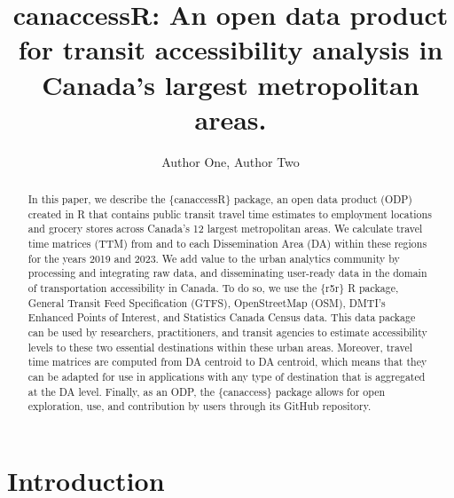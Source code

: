 \documentclass[Royal,times,sageh]{sagej}
\begin{document}

\title{canaccessR: An open data product for transit accessibility
analysis in Canada's largest metropolitan areas.}

\runninghead{}

\author{Author One\affilnum{}, Author Two\affilnum{}}

\affiliation{}



\begin{abstract}
In this paper, we describe the \{canaccessR\} package, an open data
product (ODP) created in R that contains public transit travel time
estimates to employment locations and grocery stores across Canada's 12
largest metropolitan areas. We calculate travel time matrices (TTM) from
and to each Dissemination Area (DA) within these regions for the years
2019 and 2023. We add value to the urban analytics community by
processing and integrating raw data, and disseminating user-ready data
in the domain of transportation accessibility in Canada. To do so, we
use the \{r5r\} R package, General Transit Feed Specification (GTFS),
OpenStreetMap (OSM), DMTI's Enhanced Points of Interest, and Statistics
Canada Census data. This data package can be used by researchers,
practitioners, and transit agencies to estimate accessibility levels to
these two essential destinations within these urban areas. Moreover,
travel time matrices are computed from DA centroid to DA centroid, which
means that they can be adapted for use in applications with any type of
destination that is aggregated at the DA level. Finally, as an ODP, the
\{canaccess\} package allows for open exploration, use, and contribution
by users through its GitHub repository.
\end{abstract}


\maketitle

\section{Introduction}\label{introduction}
\end{document}
